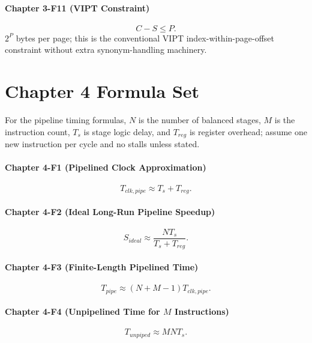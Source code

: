 \paragraph{Chapter 3-F11 (VIPT Constraint)}\label{par:auto-064}
\begin{equation}\label{eq:auto-076}
    C-S\le P.
\end{equation}
$2^P$ bytes per page; this is the conventional VIPT index-within-page-offset constraint without extra synonym-handling machinery.


\section*{Chapter 4 Formula Set}\label{sec:auto-059}
For the pipeline timing formulas, $N$ is the number of balanced stages, $M$ is the instruction count, $T_s$ is stage logic delay, and $T_{reg}$ is register overhead; assume one new instruction per cycle and no stalls unless stated.

\paragraph{Chapter 4-F1 (Pipelined Clock Approximation)}\label{par:auto-065}
\begin{equation}\label{eq:auto-077}
    T_{clk,pipe}\approx T_s+T_{reg}.
\end{equation}

\paragraph{Chapter 4-F2 (Ideal Long-Run Pipeline Speedup)}\label{par:auto-066}
\begin{equation}\label{eq:auto-078}
    S_{ideal}\approx\frac{N T_s}{T_s+T_{reg}}.
\end{equation}

\paragraph{Chapter 4-F3 (Finite-Length Pipelined Time)}\label{par:auto-067}
\begin{equation}\label{eq:auto-079}
    T_{pipe}\approx(N+M-1)T_{clk,pipe}.
\end{equation}

\paragraph{Chapter 4-F4 (Unpipelined Time for $M$ Instructions)}\label{par:auto-068}
\begin{equation}\label{eq:auto-080}
    T_{unpiped}\approx MNT_s.
\end{equation}

